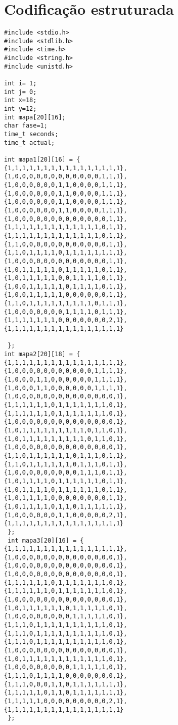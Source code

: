 \documentclass[journal]{IEEEtran}
\begin{document}
\section{Codificação estruturada}
\begin{verbatim}
#include <stdio.h>
#include <stdlib.h>
#include <time.h>
#include <string.h>
#include <unistd.h>

int i= 1;
int j= 0;
int x=18;
int y=12;
int mapa[20][16];
char fase=1;
time_t seconds;
time_t actual;

int mapa1[20][16] = {
{1,1,1,1,1,1,1,1,1,1,1,1,1,1,1,1},
{1,0,0,0,0,0,0,0,0,0,0,0,0,1,1,1},
{1,0,0,0,0,0,0,1,1,0,0,0,0,1,1,1},
{1,0,0,0,0,0,0,1,1,0,0,0,0,1,1,1},
{1,0,0,0,0,0,0,1,1,0,0,0,0,1,1,1},
{1,0,0,0,0,0,0,1,1,0,0,0,0,1,1,1},
{1,0,0,0,0,0,0,0,0,0,0,0,0,0,1,1},
{1,1,1,1,1,1,1,1,1,1,1,1,1,0,1,1},
{1,1,1,1,1,1,1,1,1,1,1,1,1,0,1,1},
{1,1,0,0,0,0,0,0,0,0,0,0,0,0,1,1},
{1,1,0,1,1,1,1,0,1,1,1,1,1,1,1,1},
{1,0,0,0,0,0,0,0,0,0,0,0,0,0,1,1},
{1,0,1,1,1,1,1,0,1,1,1,1,1,0,1,1},
{1,0,1,1,1,1,1,0,0,1,1,1,1,0,1,1},
{1,0,0,1,1,1,1,1,0,1,1,1,1,0,1,1},
{1,0,0,1,1,1,1,1,0,0,0,0,0,0,1,1},
{1,1,0,1,1,1,1,1,1,1,1,1,0,1,1,1},
{1,0,0,0,0,0,0,0,1,1,1,1,0,1,1,1},
{1,1,1,1,1,1,1,0,0,0,0,0,0,0,2,1},
{1,1,1,1,1,1,1,1,1,1,1,1,1,1,1,1}

 };
int mapa2[20][18] = {
{1,1,1,1,1,1,1,1,1,1,1,1,1,1,1,1},
{1,0,0,0,0,0,0,0,0,0,0,0,1,1,1,1},
{1,0,0,0,1,1,0,0,0,0,0,0,1,1,1,1},
{1,0,0,0,1,1,0,0,0,0,0,0,1,1,1,1},
{1,0,0,0,0,0,0,0,0,0,0,0,0,0,0,1},
{1,1,1,1,1,1,0,1,1,1,1,1,1,1,0,1},
{1,1,1,1,1,1,0,1,1,1,1,1,1,1,0,1},
{1,0,0,0,0,0,0,0,0,0,0,0,0,0,0,1},
{1,0,1,1,1,1,1,1,1,1,1,0,1,1,0,1},
{1,0,1,1,1,1,1,1,1,1,1,0,1,1,0,1},
{1,0,0,0,0,0,0,0,0,0,0,0,0,0,0,1},
{1,1,0,1,1,1,1,1,1,0,1,1,1,0,1,1},
{1,1,0,1,1,1,1,1,1,0,1,1,1,0,1,1},
{1,0,0,0,0,0,0,0,0,0,1,1,1,0,1,1},
{1,0,1,1,1,1,0,1,1,1,1,1,1,0,1,1},
{1,0,1,1,1,1,0,1,1,1,1,1,1,0,1,1},
{1,0,1,1,1,1,0,0,0,0,0,0,0,0,1,1},
{1,0,1,1,1,1,0,1,1,0,1,1,1,1,1,1},
{1,0,0,0,0,0,0,1,1,0,0,0,0,0,2,1},
{1,1,1,1,1,1,1,1,1,1,1,1,1,1,1,1}
 };
 int mapa3[20][16] = {
{1,1,1,1,1,1,1,1,1,1,1,1,1,1,1,1},
{1,0,0,0,0,0,0,0,0,0,0,0,0,0,0,1},
{1,0,0,0,0,0,0,0,0,0,0,0,0,0,0,1},
{1,0,0,0,0,0,0,0,0,0,0,0,0,0,0,1},
{1,1,1,1,1,1,0,1,1,1,1,1,1,1,0,1},
{1,1,1,1,1,1,0,1,1,1,1,1,1,1,0,1},
{1,0,0,0,0,0,0,0,0,0,0,0,0,0,0,1},
{1,0,1,1,1,1,1,1,0,1,1,1,1,1,0,1},
{1,0,0,0,0,0,0,0,0,1,1,1,1,1,0,1},
{1,1,1,0,1,1,1,1,1,1,1,1,1,1,0,1},
{1,1,1,0,1,1,1,1,1,1,1,1,1,1,0,1},
{1,1,1,0,1,1,1,1,1,1,1,1,1,1,0,1},
{1,0,0,0,0,0,0,0,0,0,0,0,0,0,0,1},
{1,0,1,1,1,1,1,1,1,1,1,1,1,1,0,1},
{1,0,0,0,0,0,0,0,0,1,1,1,1,1,0,1},
{1,1,1,0,1,1,1,1,0,0,0,0,0,0,0,1},
{1,1,1,0,0,0,1,1,0,1,1,1,1,1,1,1},
{1,1,1,1,1,0,1,1,0,1,1,1,1,1,1,1},
{1,1,1,1,1,0,0,0,0,0,0,0,0,0,2,1},
{1,1,1,1,1,1,1,1,1,1,1,1,1,1,1,1}
 };


\end{verbatim}
\end{document}
